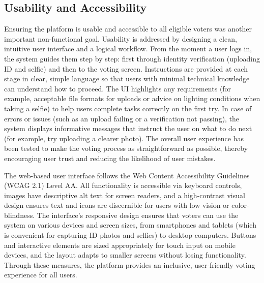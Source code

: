 \documentclass[a4paper,10pt]{report}
\begin{document}
\subsection{Usability and Accessibility}
Ensuring the platform is usable and accessible to all eligible voters was another important non-functional goal. Usability is addressed by designing a clean, intuitive user interface and a logical workflow. From the moment a user logs in, the system guides them step by step: first through identity verification (uploading ID and selfie) and then to the voting screen. Instructions are provided at each stage in clear, simple language so that users with minimal technical knowledge can understand how to proceed. The UI highlights any requirements (for example, acceptable file formats for uploads or advice on lighting conditions when taking a selfie) to help users complete tasks correctly on the first try. In case of errors or issues (such as an upload failing or a verification not passing), the system displays informative messages that instruct the user on what to do next (for example, try uploading a clearer photo). The overall user experience has been tested to make the voting process as straightforward as possible, thereby encouraging user trust and reducing the likelihood of user mistakes.

The web-based user interface follows the Web Content Accessibility Guidelines (WCAG 2.1) Level AA. All functionality is accessible via keyboard controls, images have descriptive alt text for screen readers, and a high-contrast visual design ensures text and icons are discernible for users with low vision or color-blindness. The interface’s responsive design ensures that voters can use the system on various devices and screen sizes, from smartphones and tablets (which is convenient for capturing ID photos and selfies) to desktop computers. Buttons and interactive elements are sized appropriately for touch input on mobile devices, and the layout adapts to smaller screens without losing functionality. Through these measures, the platform provides an inclusive, user-friendly voting experience for all users.
\end{document}
